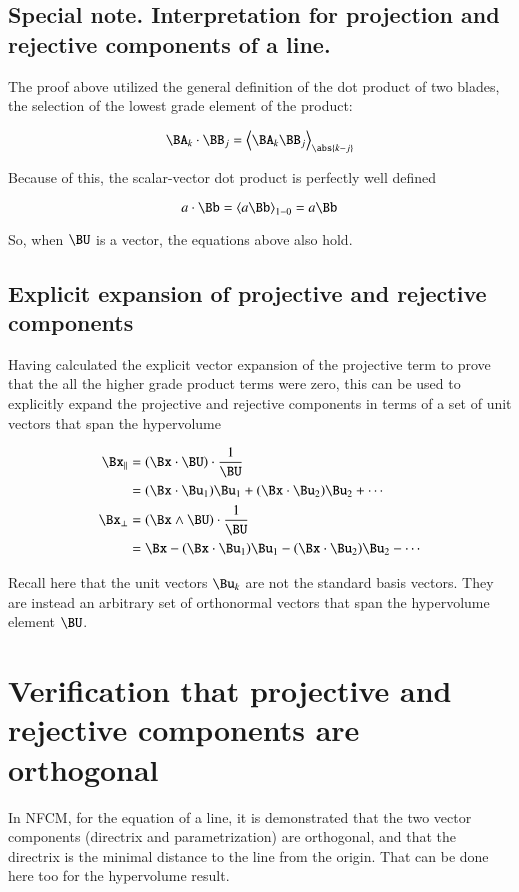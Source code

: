 \subsection{Special note.  Interpretation for projection and rejective components of a line. }

The proof above utilized the general definition of the dot product of two blades, the selection of the lowest grade element of the product:

\[
\BA_k \cdot \BB_j = \left<\BA_k \BB_j\right>_{\abs{k-j}}
\]

Because of this, the scalar-vector dot product is perfectly well defined

\[
a \cdot \Bb = \left<a \Bb\right>_{1-0} = a \Bb
\]

So, when $\BU$ is a vector, the equations above also hold.

\subsection{Explicit expansion of projective and rejective components }

Having calculated the explicit vector expansion of the projective term to prove that the all the higher grade
product terms were zero, this can be used to explicitly expand the projective and rejective components
in terms of a set of unit vectors that span the hypervolume

\begin{align*}
\Bx_\parallel 
&= (\Bx \cdot \BU) \cdot \frac{1}{\BU} \\
&= 
  (\Bx \cdot \Bu_1)\Bu_1
+ (\Bx \cdot \Bu_2)\Bu_2
+ \cdots \\
\Bx_\perp
&= (\Bx \wedge \BU) \cdot \frac{1}{\BU} \\
&= \Bx
- (\Bx \cdot \Bu_1)\Bu_1
- (\Bx \cdot \Bu_2)\Bu_2
- \cdots \\
\end{align*}

Recall here that the unit vectors $\Bu_k$ are not the standard basis vectors.
They are instead an arbitrary set of orthonormal vectors that span the hypervolume element $\BU$.

\section{Verification that projective and rejective components are orthogonal }

In NFCM, for the equation of a line, it is demonstrated that the two vector components (directrix and parametrization) are orthogonal, and that the directrix is the minimal distance to the line from the origin.  That can be done here too for the hypervolume result.

